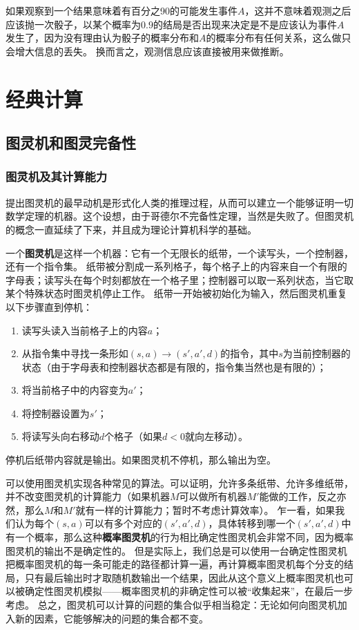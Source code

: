 \documentclass[UTF8, a4paper]{ctexart}
\begin{document}
如果观察到一个结果意味着有百分之90的可能发生事件$A$，这并不意味着观测之后应该抛一次骰子，以某个概率为$0.9$的结局是否出现来决定是不是应该认为事件$A$发生了，因为没有理由认为骰子的概率分布和$A$的概率分布有任何关系，这么做只会增大信息的丢失。
换而言之，观测信息应该直接被用来做推断。

\section{经典计算}

\subsection{图灵机和图灵完备性}

\subsubsection{图灵机及其计算能力}

提出图灵机的最早动机是形式化人类的推理过程，从而可以建立一个能够证明一切数学定理的机器。这个设想，由于哥德尔不完备性定理，当然是失败了。但图灵机的概念一直延续了下来，并且成为理论计算机科学的基础。

一个\textbf{图灵机}是这样一个机器：它有一个无限长的纸带，一个读写头，一个控制器，还有一个指令集。
纸带被分割成一系列格子，每个格子上的内容来自一个有限的字母表；读写头在每个时刻都放在一个格子里；控制器可以取一系列状态，当它取某个特殊状态时图灵机停止工作。
纸带一开始被初始化为输入，然后图灵机重复以下步骤直到停机：
\begin{enumerate}
    \item 读写头读入当前格子上的内容$a$；
    \item 从指令集中寻找一条形如$(s, a) \longrightarrow (s', a', d)$的指令，其中$s$为当前控制器的状态（由于字母表和控制器状态都是有限的，指令集当然也是有限的）；
    \item 将当前格子中的内容变为$a'$；
    \item 将控制器设置为$s'$；
    \item 将读写头向右移动$d$个格子（如果$d<0$就向左移动）。
\end{enumerate}
停机后纸带内容就是输出。如果图灵机不停机，那么输出为空。

可以使用图灵机实现各种常见的算法。可以证明，允许多条纸带、允许多维纸带，并不改变图灵机的计算能力（如果机器$M$可以做所有机器$M'$能做的工作，反之亦然，那么$M$和$M'$就有一样的计算能力；暂时不考虑计算效率）。
乍一看，如果我们认为每个$(s, a)$可以有多个对应的$(s', a', d)$，具体转移到哪一个$(s', a', d)$中有一个概率，那么这种\textbf{概率图灵机}的行为相比确定性图灵机会非常不同，因为概率图灵机的输出不是确定性的。
但是实际上，我们总是可以使用一台确定性图灵机把概率图灵机的每一条可能走的路径都计算一遍，再计算概率图灵机每个分支的结局，只有最后输出时才取随机数输出一个结果，因此从这个意义上概率图灵机也可以被确定性图灵机模拟——概率图灵机的非确定性可以被“收集起来”，在最后一步考虑。
总之，图灵机可以计算的问题的集合似乎相当稳定：无论如何向图灵机加入新的因素，它能够解决的问题的集合都不变。
\end{document}
